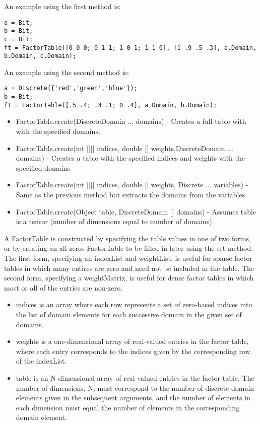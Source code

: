 An example using the first method is:
\begin{lstlisting}
a = Bit;
b = Bit;
c = Bit;
ft = FactorTable([0 0 0; 0 1 1; 1 0 1; 1 1 0], [1 .9 .5 .3], a.Domain, b.Domain, c.Domain);
\end{lstlisting}

An example using the second method is:
\begin{lstlisting}
a = Discrete({'red','green','blue'});
b = Bit;
ft = FactorTable([.5 .4; .3 .1; 0 .4], a.Domain, b.Domain);
\end{lstlisting}

\fi

\ifjava

\begin{itemize}
\item FactorTable.create(DiscreteDomain ... domains) - Creates a full table with with the specified domains.
\item FactorTable.create(int [][] indices, double [] weights,DiscreteDomain ... domains) - Creates a table with the specified indices and weights with the specified domains
\item FactorTable.create(int [][] indices, double [] weights, Discrete ... variables) - Same as the previous method but extracts the domains from the variables.
\item FactorTable.create(Object table, DiscreteDomain [] domains) - Assumes table is a tensor (number of dimensions equal to number of domains).  
\end{itemize}

A FactorTable is constructed by specifying the table values in one of two forms, or by creating an all-zeros FactorTable to be filled in later using the set method.  The first form, specifying an indexList and weightList, is useful for sparse factor tables in which many entires are zero and need not be included in the table.  The second form, specifying a weightMatrix, is useful for dense factor tables in which most or all of the entries are non-zero.

\begin{itemize}
\item indices is an array where each row represents a set of zero-based indices into the list of domain elements for each successive domain in the given set of domains.
\item weights is a one-dimensional array of real-valued entries in the factor table, where each entry corresponds to the indices given by the corresponding row of the indexList.
\item table is an N dimensional array of real-valued entries in the factor table.  The number of dimensions, N, must correspond to the number of discrete domain elements given in the subsequent arguments, and the number of elements in each dimension must equal the number of elements in the corresponding domain element.
\end{itemize}


